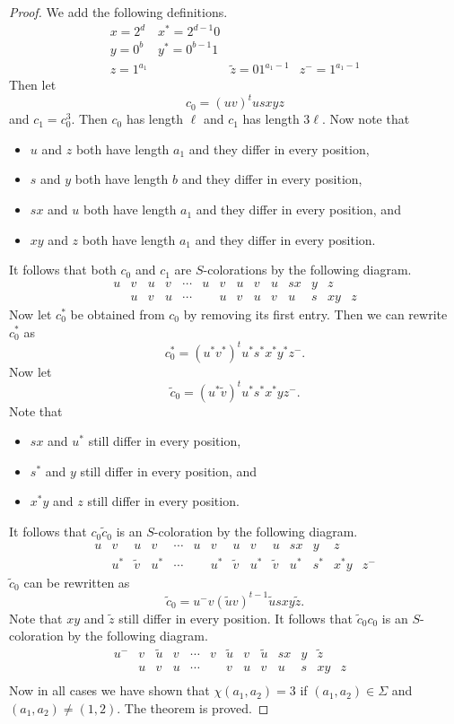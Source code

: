 \documentclass[11pt]{amsart}
\theoremstyle{definition}
\begin{document}
\begin{proof}
We add the following definitions.
$$ \begin{array}{llll}
x=2^d & x^*=2^{d-1}0 & & \\
y=0^b & y^*=0^{b-1}1 &  & \\
z=1^{a_1} & & \tilde{z}=01^{a_1-1} & z^-=1^{a_1-1}
\end{array}
$$ 
Then let
$$ c_0=(uv)^tusxyz $$
and $c_1=c_0^3$. Then $c_0$ has length $\ell$ and $c_1$ has length $3\ell$. Now note that
\begin{itemize}
\item $u$ and $z$ both have length $a_1$ and they differ in every position,
\item $s$ and $y$ both have length $b$  and they differ in every position,
\item $sx$ and $u$ both have length $a_1$ and they differ in every position, and
\item $xy$ and $z$ both have length $a_1$ and they differ in every position.
\end{itemize}
It follows that both $c_0$ and $c_1$ are $S$-colorations by the following diagram.
$$  \begin{array}{rcccccccccccccl}
    u & v & u & v & \cdots & u & v & u & v & u & sx &  y & z & \\
    & u & v & u & \cdots & & u& v& u & v& u& s & xy & z     \end{array}
   $$
Now let $c_0^*$ be obtained from $c_0$ by removing its first entry. Then we can rewrite $c_0^*$ as
$$ c_0^*=(u^*v^*)^tu^*s^*x^*y^*z^{-}.$$
Now let
$$ \tilde{c}_0=(u^*\tilde{v})^tu^*s^*x^*yz^{-}. $$
Note that
\begin{itemize}
\item $sx$ and $u^*$ still differ in every position, 
\item $s^*$ and $y$ still differ in every position, and
\item $x^*y$ and $z$ still differ in every position.
\end{itemize}
It follows that $c_0\tilde{c}_0$ is an $S$-coloration by the following diagram.
$$  \begin{array}{rcccccccccccccl}
    u & v & u & v & \cdots & u & v & u & v & u & sx &  y & z & \\
    & u^* & \tilde{v} & u^* & \cdots & & u^*& \tilde{v}& u^* & \tilde{v}& u^*& s^* & x^*y & z^{-}    \end{array}
   $$
$\tilde{c}_0$ can be rewritten as 
   $$ \tilde{c}_0=u^{-}v(\tilde{u}v)^{t-1}\tilde{u}sxy\tilde{z}. $$
   Note that $xy$ and $\tilde{z}$ still differ in every position. It follows that $\tilde{c}_0c_0$ is an $S$-coloration by the following diagram.
   $$  \begin{array}{rcccccccccccccl}
   u^{-} & v & \tilde{u} & v& \cdots & v & \tilde{u} & v &\tilde{u} & sx & y & \tilde{z} \\
   & u & v & u & \cdots &  & v & u & v & u & s &  xy & z & \\
    \end{array}
   $$
Now in all cases we have shown that $\chi(a_1, a_2)=3$ if $(a_1, a_2)\in \Sigma$ and $(a_1, a_2)\neq (1,2)$. The theorem is proved.
\end{proof}
\end{document}
